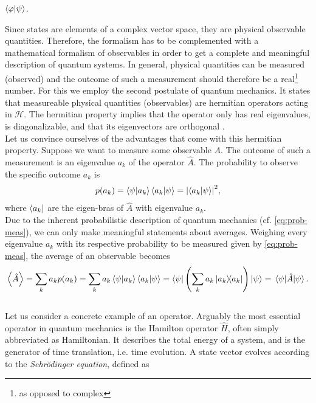 \documentclass{book}
\numberwithin{equation}{section} %
\begin{document}
$\braket{\varphi}{\psi}$.
\par
Since states are elements of a complex vector space, they are physical observable quantities. Therefore, the formalism
has to be complemented with a mathematical formalism of observables in order to get a complete and meaningful description of quantum systems.
In general, physical quantities can be measured (observed) and the outcome of such a measurement should therefore be
a real\footnote{as opposed to complex} number.
For this we employ the second postulate of quantum mechanics. It states that measureable physical quantities
(observables) are hermitian operators acting in $\mathcal{H}$. %
The hermitian property implies that the operator only has real eigenvalues, is diagonalizable,
and that its eigenvectors are orthogonal \cite{BA_messiah2014quantum}.\\
Let us convince ourselves of the advantages that come with this hermitian property.
Suppose we want to measure some observable $A$.
The outcome of such a measurement is an eigenvalue $a_k$ of the operator $\hat{A}$. The probability to observe the specific outcome $a_k$ is
\begin{align}\label{eq:prob-meas}
    p(a_k) = \braket{\psi}{a_k}\braket{a_k}{\psi} = \abs{\braket{a_k}{\psi}}^2,
\end{align}
where $\bra{a_k}$ are the eigen-bras of $\hat{A}$ with eigenvalue $a_k$.\\
Due to the inherent probabilistic description of quantum mechanics (cf. \cref{eq:prob-meas}), we can only make meaningful statements about averages.
Weighing every eigenvalue $a_k$ with its respective probability to be measured given by \cref{eq:prob-meas}, the average of an observable becomes \cite{BA_HS_nielsenchuang}
\begin{align}
    \expval{\hat{A}} = \sum\limits_k a_k p(a_k) = \sum\limits_k a_k \braket{\psi}{a_k}\braket{a_k}{\psi}
    = \bra{\psi} \left(\sum\limits_k a_k \dyad{a_k}\right) \ket{\psi} = \ev{\hat{A}}{\psi}.
\end{align}\\
Let us consider a concrete example of an operator.
Arguably the most essential operator in quantum mechanics is the Hamilton operator $\hat{H}$, often simply abbreviated as Hamiltonian.
It describes the total energy of a system, and is the generator of time translation, i.e. time evolution. A state vector evolves
according to the \emph{Schrödinger equation}, defined as \cite{BA_messiah2014quantum}
\end{document}
